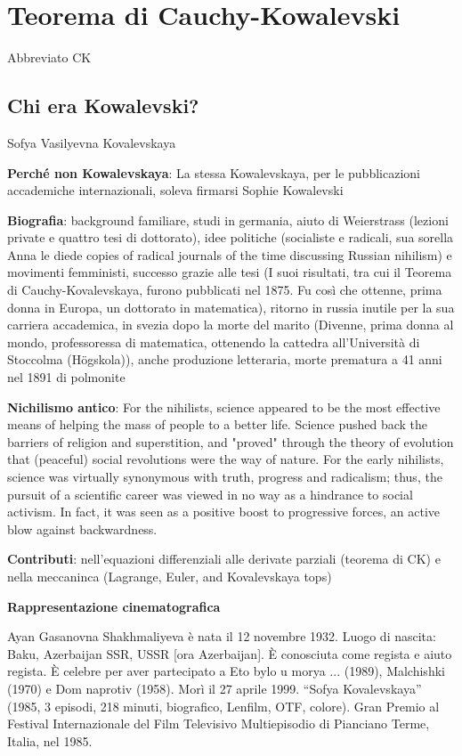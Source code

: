 \chapter{Teorema di Cauchy-Kowalevski}
Abbreviato CK

\section{Chi era Kowalevski?}

Sofya Vasilyevna Kovalevskaya

\textbf{Perché non Kowalevskaya}:  La stessa Kowalevskaya, per le pubblicazioni accademiche internazionali, soleva firmarsi Sophie Kowalevski

\textbf{Biografia}: background familiare, studi in germania, aiuto di Weierstrass (lezioni private e quattro tesi di dottorato), idee politiche (socialiste e radicali, sua sorella Anna le diede copies of radical journals of the time discussing Russian nihilism) e movimenti femministi, successo grazie alle tesi (I suoi risultati, tra cui il Teorema di Cauchy-Kovalevskaya, furono pubblicati nel 1875. Fu così che ottenne, prima donna in Europa, un dottorato in matematica), ritorno in russia inutile per la sua carriera accademica, in svezia dopo la morte del marito (Divenne, prima donna al mondo, professoressa di matematica, ottenendo la cattedra all'Università di Stoccolma (Högskola)), anche produzione letteraria, morte prematura a 41 anni nel 1891 di polmonite

\textbf{Nichilismo antico}: For the nihilists, science appeared to be the most effective means of helping the mass of people to a better life. Science pushed back the barriers of religion and superstition, and "proved" through the theory of evolution that (peaceful) social revolutions were the way of nature. For the early nihilists, science was virtually synonymous with truth, progress and radicalism; thus, the pursuit of a scientific career was viewed in no way as a hindrance to social activism. In fact, it was seen as a positive boost to progressive forces, an active blow against backwardness.

\textbf{Contributi}: nell'equazioni differenziali alle derivate parziali (teorema di CK) e nella meccaninca (Lagrange, Euler, and Kovalevskaya tops)

\textbf{Rappresentazione cinematografica}

Ayan Gasanovna Shakhmaliyeva è nata il 12 novembre 1932. Luogo di nascita: Baku, Azerbaijan SSR, USSR [ora Azerbaijan]. È conosciuta come regista e aiuto regista. È celebre per aver partecipato a Eto bylo u morya ... (1989), Malchishki (1970) e Dom naprotiv (1958). Morì il 27 aprile 1999. “Sofya Kovalevskaya” (1985, 3 episodi, 218 minuti, biografico, Lenfilm, OTF, colore). Gran Premio al Festival Internazionale del Film Televisivo Multiepisodio di Pianciano Terme, Italia, nel 1985.

